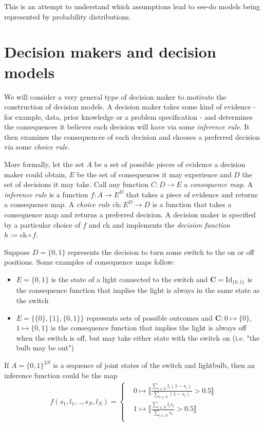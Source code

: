 

This is an attempt to understand which assumptions lead to see-do models being represented by probability distributions.

\section{Decision makers and decision models}\label{sec:decision_makers_decision_models}

We will consider a very general type of decision maker to motivate the construction of decision models. A decision maker takes some kind of evidence - for example, data, prior knowledge or a problem specification - and determines the consequences it believes each decision will have via some \emph{inference rule}. It then examines the consequences of each decision and chooses a preferred decision via some \emph{choice rule}. 

More formally, let the set $A$ be a set of possible pieces of evidence a decision maker could obtain, $E$ be the set of consequences it may experience and $D$ the set of decisions it may take. Call any function $C:D\to E$ a \emph{consequence map}. A \emph{inference rule} is a function $f:A\to E^D$ that takes a piece of evidence and returns a consequence map. A \emph{choice rule} $\mathrm{ch}:E^D\to D$ is a function that takes a consequence map and returns a preferred decision. A decision maker is specified by a particular choice of $f$ and $\mathrm{ch}$ and implements the \emph{decision function} $h:=\mathrm{ch}\circ f$.

Suppose $D=\{0,1\}$ represents the decision to turn some switch to the on or off positions. Some examples of consequence maps follow:
\begin{itemize}
	\item $E=\{0,1\}$ is the state of a light connected to the switch and $\mathbf{C}=\mathrm{Id}_{\{0,1\}}$ is the consequence function that implies the light is always in the same state as the switch
	\item $E=\{\{0\},\{1\},\{0,1\}\}$ represents sets of possible outcomes and $\mathbf{C}:0\mapsto \{0\}$, $1\mapsto\{0,1\}$ is the consequence function that implies the light is always off when the switch is off, but may take either state with the switch on (i.e. "the bulb may be out")
\end{itemize}

If $A=\{0,1\}^{2N}$ is a sequence of joint states of the switch and lightbulb, then an inference function could be the map
\begin{align}
	f(s_{1},l_{1},..,s_N,l_N) = \begin{cases}
									&0\mapsto \llbracket\frac{\sum_{i\in N} l_i(1-s_i)}{\sum_{i\in N} (1-s_i)}>0.5\rrbracket\\
									&1\mapsto \llbracket\frac{\sum_{i\in N} l_i s_i}{\sum_{i\in N} s_i}>0.5\rrbracket\\
								\end{cases}
\end{align}


